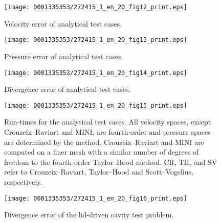 \begin{figure}[!t]
  \texttt{[image: 0001335353/272415\_1\_en\_20\_fig12\_print.eps]}
  \caption{Velocity error of analytical test cases.}
  \label{fig:terrel:4th_Order:vel}\vspace*{7pt}
\end{figure}

\begin{figure}[!t]
  \texttt{[image: 0001335353/272415\_1\_en\_20\_fig13\_print.eps]}
  \caption{Pressure error of analytical test cases.}
  \label{fig:terrel:4th_Order:press}
\end{figure}

\begin{figure}[!p]
  \texttt{[image: 0001335353/272415\_1\_en\_20\_fig14\_print.eps]}
  \caption{Divergence error of analytical test cases.}
  \label{fig:terrel:4th_Order:div}
\end{figure}

\begin{figure}[!p]
  \texttt{[image: 0001335353/272415\_1\_en\_20\_fig15\_print.eps]}
  \caption{Run-times for the analytical test cases.  All velocity spaces,
    except Crouzeix--Raviart and MINI, are fourth-order and pressure
    spaces are determined by the method. Crouzeix--Raviart and MINI are
    computed on a finer mesh with a similar number of degrees of freedom
    to the fourth-order Taylor--Hood method. CR, TH, and SV refer to
    Crouzeix--Raviart, Taylor--Hood and Scott--Vogelius, respectively.}
  \label{fig:terrel:4th_Order:run}
\end{figure}

\begin{figure}[!p]
\texttt{[image: 0001335353/272415\_1\_en\_20\_fig16\_print.eps]}
\caption{Divergence error of the lid-driven cavity test problem.}
\label{fig:terrel:4th_Order_lid}\vspace*{-12pt}
\end{figure}

